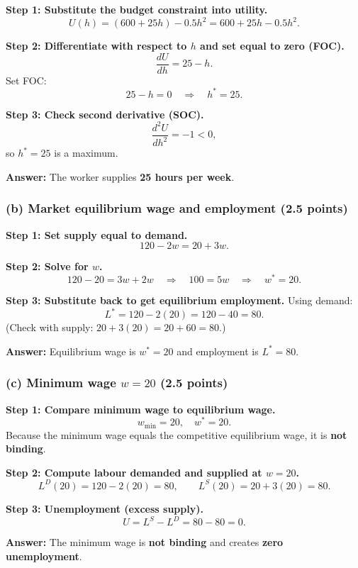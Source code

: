 \documentclass[11pt]{article}
\begin{document}
\textbf{Step 1: Substitute the budget constraint into utility.}
\[
U(h) = (600 + 25h) - 0.5h^2
= 600 + 25h - 0.5h^2.
\]

\textbf{Step 2: Differentiate with respect to $h$ and set equal to zero (FOC).}
\[
\frac{dU}{dh} = 25 - h.
\]
Set FOC:
\[
25 - h = 0 \quad \Rightarrow \quad h^* = 25.
\]

\textbf{Step 3: Check second derivative (SOC).}
\[
\frac{d^2U}{dh^2} = -1 < 0,
\]
so $h^*=25$ is a maximum.

\textbf{Answer:} The worker supplies \textbf{25 hours per week}.

\subsubsection*{(b) Market equilibrium wage and employment (2.5 points)}

\textbf{Step 1: Set supply equal to demand.}
\[
120 - 2w = 20 + 3w.
\]

\textbf{Step 2: Solve for $w$.}
\[
120 - 20 = 3w + 2w
\quad \Rightarrow \quad
100 = 5w
\quad \Rightarrow \quad
w^* = 20.
\]

\textbf{Step 3: Substitute back to get equilibrium employment.}
Using demand:
\[
L^* = 120 - 2(20) = 120 - 40 = 80.
\]
(Check with supply: $20 + 3(20)=20+60=80$.)

\textbf{Answer:} Equilibrium wage is \textbf{$w^*=20$} and employment is \textbf{$L^*=80$}.

\subsubsection*{(c) Minimum wage $w=20$ (2.5 points)}

\textbf{Step 1: Compare minimum wage to equilibrium wage.}
\[
w_{\min} = 20,\quad w^* = 20.
\]
Because the minimum wage equals the competitive equilibrium wage, it is \textbf{not binding}.

\textbf{Step 2: Compute labour demanded and supplied at $w=20$.}
\[
L^D(20) = 120 - 2(20) = 80,
\qquad
L^S(20) = 20 + 3(20) = 80.
\]

\textbf{Step 3: Unemployment (excess supply).}
\[
U = L^S - L^D = 80 - 80 = 0.
\]

\textbf{Answer:} The minimum wage is \textbf{not binding} and creates \textbf{zero unemployment}.
\end{document}
